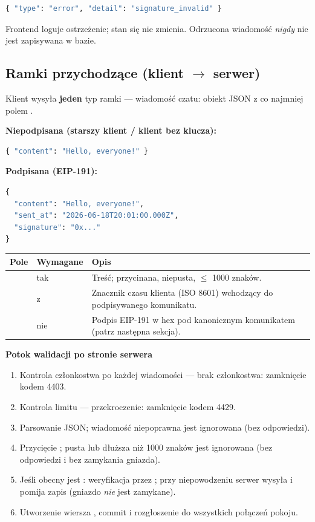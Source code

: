 \begin{lstlisting}[language=Python]
{ "type": "error", "detail": "signature_invalid" }
\end{lstlisting}

Frontend loguje ostrzeżenie; stan się nie zmienia. Odrzucona wiadomość \emph{nigdy} nie jest zapisywana
w bazie.

\subsection{Ramki przychodzące (klient $\to$ serwer)}
\label{sec:rt-ramki-przychodzace}

Klient wysyła \textbf{jeden} typ ramki --- wiadomość czatu: obiekt JSON z co najmniej polem .

\textbf{Niepodpisana (starszy klient / klient bez klucza):}

\begin{lstlisting}[language=Python]
{ "content": "Hello, everyone!" }
\end{lstlisting}

\textbf{Podpisana (EIP-191):}

\begin{lstlisting}[language=Python]
{
  "content": "Hello, everyone!",
  "sent_at": "2026-06-18T20:01:00.000Z",
  "signature": "0x..."
}
\end{lstlisting}

\begin{tabularx}{\textwidth}{llY}
\toprule
Pole & Wymagane & Opis \\
\midrule
{} & tak & Treść; przycinana, niepusta, $\leq$ 1000 znaków. \\
 & z  & Znacznik czasu klienta (ISO 8601) wchodzący do podpisywanego komunikatu. \\
 & nie & Podpis EIP-191 w hex pod kanonicznym komunikatem (patrz następna sekcja). \\
\bottomrule
\end{tabularx}

\textbf{Potok walidacji po stronie serwera}
\begin{enumerate}[nosep]
  \item Kontrola członkostwa po każdej wiadomości --- brak członkostwa: zamknięcie kodem 4403.
  \item Kontrola limitu --- przekroczenie: zamknięcie kodem 4429.
  \item Parsowanie JSON; wiadomość niepoprawna jest ignorowana (bez odpowiedzi).
  \item Przycięcie ; pusta lub dłuższa niż 1000 znaków jest ignorowana (bez odpowiedzi i bez zamykania gniazda).
  \item Jeśli obecny jest : weryfikacja przez ; przy niepowodzeniu serwer wysyła  i pomija zapis (gniazdo \emph{nie} jest zamykane).
  \item Utworzenie wiersza , commit i rozgłoszenie  do wszystkich połączeń pokoju.
\end{enumerate}

